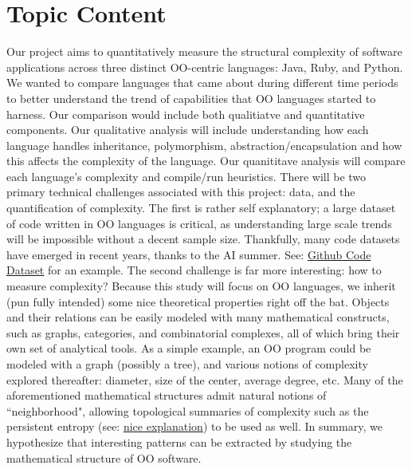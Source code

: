 \documentclass{article}
\begin{document}
\section{Topic Content}
Our project aims to quantitatively measure the structural complexity of software applications across three distinct OO-centric languages: Java, Ruby, and Python. We wanted to compare languages that came about during different time periods to better understand the trend of capabilities that OO languages started to harness. Our comparison would include both qualitiatve and quantitative components. Our qualitative analysis will include understanding how each language handles inheritance, polymorphism, abstraction/encapsulation and how this affects the complexity of the language. Our quanititave analysis will compare each language's complexity and compile/run heuristics.
There will be two primary technical challenges associated with this project: data, and the quantification of complexity. The first is rather self explanatory; a large dataset of code written in OO languages is critical, as understanding large scale trends will be impossible without a decent sample size. Thankfully, many code datasets have emerged in recent years, thanks to the AI summer. See: \href{https://huggingface.co/datasets/codeparrot/github-code}{Github Code Dataset} for an example. The second challenge is far more interesting: how to measure complexity? Because this study will focus on OO languages, we inherit (pun fully intended) some nice theoretical properties right off the bat. Objects and their relations can be easily modeled with many mathematical constructs, such as graphs, categories, and combinatorial complexes, all of which bring their own set of analytical tools. As a simple example, an OO program could be modeled with a graph (possibly a tree), and various notions of complexity explored thereafter: diameter, size of the center, average degree, etc. Many of the aforementioned mathematical structures admit natural notions of ``neighborhood", allowing topological summaries of complexity such as the persistent entropy (see: \href{https://github.com/GUDHI/TDA-tutorial/blob/master/Tuto-GUDHI-persistent-entropy.ipynb}{nice explanation}) to be used as well. In summary, we hypothesize that interesting patterns can be extracted by studying the mathematical structure of OO software.
\end{document}
